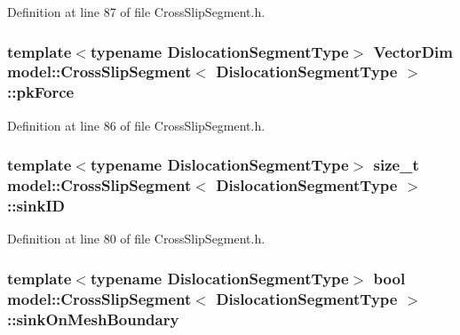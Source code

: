 Definition at line 87 of file Cross\+Slip\+Segment.\+h.

\hypertarget{classmodel_1_1_cross_slip_segment_a3c41fc4abf7195d47e366fa0c4ebc008}{}
\subsubsection[{pk\+Force}]{\setlength{\rightskip}{0pt plus 5cm}template$<$typename Dislocation\+Segment\+Type$>$ Vector\+Dim {\bf model\+::\+Cross\+Slip\+Segment}$<$ Dislocation\+Segment\+Type $>$\+::pk\+Force}\label{classmodel_1_1_cross_slip_segment_a3c41fc4abf7195d47e366fa0c4ebc008}


Definition at line 86 of file Cross\+Slip\+Segment.\+h.

\hypertarget{classmodel_1_1_cross_slip_segment_a6c2b804d97829bc801afe80eb1c7428c}{}
\subsubsection[{sink\+I\+D}]{\setlength{\rightskip}{0pt plus 5cm}template$<$typename Dislocation\+Segment\+Type$>$ size\+\_\+t {\bf model\+::\+Cross\+Slip\+Segment}$<$ Dislocation\+Segment\+Type $>$\+::sink\+I\+D}\label{classmodel_1_1_cross_slip_segment_a6c2b804d97829bc801afe80eb1c7428c}


Definition at line 80 of file Cross\+Slip\+Segment.\+h.

\hypertarget{classmodel_1_1_cross_slip_segment_a6eeaa170476f67a93823bc2e453b1bd2}{}
\subsubsection[{sink\+On\+Mesh\+Boundary}]{\setlength{\rightskip}{0pt plus 5cm}template$<$typename Dislocation\+Segment\+Type$>$ bool {\bf model\+::\+Cross\+Slip\+Segment}$<$ Dislocation\+Segment\+Type $>$\+::sink\+On\+Mesh\+Boundary}\label{classmodel_1_1_cross_slip_segment_a6eeaa170476f67a93823bc2e453b1bd2}


